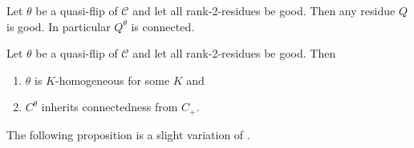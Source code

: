 \begin{prop}
	Let $\theta$ be a quasi-flip of $\mathcal{C}$ and let all rank-2-residues be good. Then any residue $Q$ is good. In particular $Q^\theta$ is connected.
\end{prop}

\begin{prop}
	Let $\theta$ be a quasi-flip of $\mathcal{C}$ and let all rank-2-residues be good. Then
	\begin{enumerate}
		\item $\theta$ is $K$-homogeneous for some $K$ and
		\item $C^\theta$ inherits connectedness from $C_+$.
	\end{enumerate}
\end{prop}

The following proposition is a slight variation of \cite[Proposition 4.5.4]{horn:kac-moody}.

